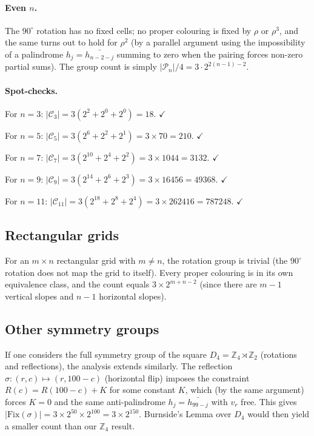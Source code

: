 \documentclass{article}
\newcommand{\calC}{\mathcal{C}}
\newcommand{\calP}{\mathcal{P}}
\newcommand{\Fix}{\mathrm{Fix}}
\newcommand{\comp}[1]{\bar{#1}}   %
\begin{document}
\paragraph{Even $n$.}
The $90^\circ$ rotation has no fixed cells; no proper colouring
is fixed by $\rho$ or $\rho^3$, and the same turns out to hold
for $\rho^2$ (by a parallel argument using the impossibility
of a palindrome $h_j = \comp{h_{n-2-j}}$ summing to zero
when the pairing forces non-zero partial sums).  The group
count is simply $|\calP_n|/4 = 3\cdot 2^{2(n-1)-2}$.

\paragraph{Spot-checks.}

For $n=3$: $|\calC_3| = 3(2^2+2^0+2^0) = 18$. $\checkmark$

For $n=5$: $|\calC_5| = 3(2^6+2^2+2^1) = 3\times 70 = 210$. $\checkmark$

For $n=7$: $|\calC_7| = 3(2^{10}+2^4+2^2) = 3\times 1044 = 3132$. $\checkmark$

For $n=9$: $|\calC_9| = 3(2^{14}+2^6+2^3) = 3\times 16456 = 49368$. $\checkmark$

For $n=11$: $|\calC_{11}| = 3(2^{18}+2^8+2^4) = 3\times 262416 = 787248$. $\checkmark$

\subsection{Rectangular grids}

For an $m\times n$ rectangular grid with $m\neq n$, the
rotation group is trivial (the $90^\circ$ rotation does not
map the grid to itself).  Every proper colouring is in its
own equivalence class, and the count equals $3\times 2^{m+n-2}$
(since there are $m-1$ vertical slopes and $n-1$ horizontal
slopes).

\subsection{Other symmetry groups}

If one considers the full symmetry group of the square
$D_4 = \mathbb{Z}_4 \rtimes \mathbb{Z}_2$ (rotations and
reflections), the analysis extends similarly.  The reflection
$\sigma:(r,c)\mapsto(r,100-c)$ (horizontal flip) imposes
the constraint $R(c) = R(100-c)+K$ for some constant $K$,
which (by the same argument) forces $K=0$ and the same
anti-palindrome $h_j = \comp{h_{99-j}}$ with $v_r$ free.
This gives $|\Fix(\sigma)| = 3\times 2^{50}\times 2^{100}
= 3\times 2^{150}$.  Burnside's Lemma over $D_4$ would then
yield a smaller count than our $\mathbb{Z}_4$ result.
\end{document}
